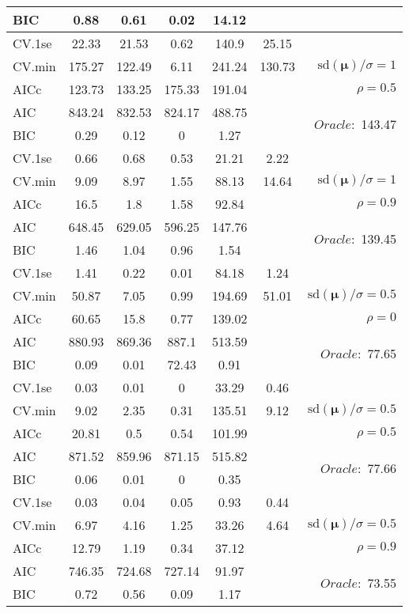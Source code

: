 \begin{table}
\begin{center}
\begin{tabular}{l*{5}{c}|r}
BIC & 0.88 & 0.61 & 0.02 & 14.12 & &  \\
 \hline 
CV.1se & 22.33 & 21.53 & 0.62 & 140.9 & 25.15 & \\
CV.min & 175.27 & 122.49 & 6.11 & 241.24 & 130.73 &  $\mathrm{sd}(\mathbf{\mu})/\sigma=1$ \\
AICc & 123.73 & 133.25 & 175.33 & 191.04 & & $\rho=0.5$ \\
AIC & 843.24 & 832.53 & 824.17 & 488.75 & &  \multirow{2}{*}{$Oracle: $ 143.47} \\
BIC & 0.29 & 0.12 & 0 & 1.27 & &  \\
 \hline 
CV.1se & 0.66 & 0.68 & 0.53 & 21.21 & 2.22 & \\
CV.min & 9.09 & 8.97 & 1.55 & 88.13 & 14.64 &  $\mathrm{sd}(\mathbf{\mu})/\sigma=1$ \\
AICc & 16.5 & 1.8 & 1.58 & 92.84 & & $\rho=0.9$ \\
AIC & 648.45 & 629.05 & 596.25 & 147.76 & &  \multirow{2}{*}{$Oracle: $ 139.45} \\
BIC & 1.46 & 1.04 & 0.96 & 1.54 & &  \\
 \hline 
CV.1se & 1.41 & 0.22 & 0.01 & 84.18 & 1.24 & \\
CV.min & 50.87 & 7.05 & 0.99 & 194.69 & 51.01 &  $\mathrm{sd}(\mathbf{\mu})/\sigma=0.5$ \\
AICc & 60.65 & 15.8 & 0.77 & 139.02 & & $\rho=0$ \\
AIC & 880.93 & 869.36 & 887.1 & 513.59 & &  \multirow{2}{*}{$Oracle: $ 77.65} \\
BIC & 0.09 & 0.01 & 72.43 & 0.91 & &  \\
 \hline 
CV.1se & 0.03 & 0.01 & 0 & 33.29 & 0.46 & \\
CV.min & 9.02 & 2.35 & 0.31 & 135.51 & 9.12 &  $\mathrm{sd}(\mathbf{\mu})/\sigma=0.5$ \\
AICc & 20.81 & 0.5 & 0.54 & 101.99 & & $\rho=0.5$ \\
AIC & 871.52 & 859.96 & 871.15 & 515.82 & &  \multirow{2}{*}{$Oracle: $ 77.66} \\
BIC & 0.06 & 0.01 & 0 & 0.35 & &  \\
 \hline 
CV.1se & 0.03 & 0.04 & 0.05 & 0.93 & 0.44 & \\
CV.min & 6.97 & 4.16 & 1.25 & 33.26 & 4.64 &  $\mathrm{sd}(\mathbf{\mu})/\sigma=0.5$ \\
AICc & 12.79 & 1.19 & 0.34 & 37.12 & & $\rho=0.9$ \\
AIC & 746.35 & 724.68 & 727.14 & 91.97 & &  \multirow{2}{*}{$Oracle: $ 73.55} \\
BIC & 0.72 & 0.56 & 0.09 & 1.17 & &  \\
 \hline 
\end{tabular}
\end{center}
\vspace{-1cm}
\end{table}





